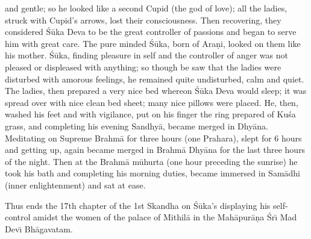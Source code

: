 and gentle; so he looked like a second Cupid (the god of love); all the ladies, struck with Cupid's arrows, lost their consciousness. Then recovering, they considered \'S\=uka Deva to be the great controller of passions and began to serve him with great care. The pure minded \'S\=uka, born of Ara\d{n}i, looked on them like his mother. \'S\=uka, finding pleasure in self and the controller of anger was not pleased or displeased with anything; so though be saw that the ladies were disturbed with amorous feelings, he remained quite undisturbed, calm and quiet. The ladies, then prepared a very nice bed whereon \'S\=uka Deva would sleep; it was spread over with nice clean bed sheet; many nice pillows were placed. He, then, washed his feet and with vigilance, put on his finger the ring prepared of Ku\'sa grass, and completing his evening Sandhy\=a, became merged in Dhy\=ana. Meditating on Supreme Brahm\=a for three hours (one Prahara), slept for 6 hours and getting up, again became merged in Brahm\=a Dhy\=ana for the last three hours of the night. Then at the Brahm\=a m\=uhurta (one hour preceding the sunrise) he took his bath and completing his morning duties, became immersed in Sam\=adhi (inner enlightenment) and sat at ease.

Thus ends the 17th chapter of the 1st Skandha on \'S\=uka's displaying his self-control amidst the women of the palace of Mithil\=a in the Mah\=apur\=a\d{n}a \'Sr\={\i} Mad Dev\={\i} Bh\=agavatam.



